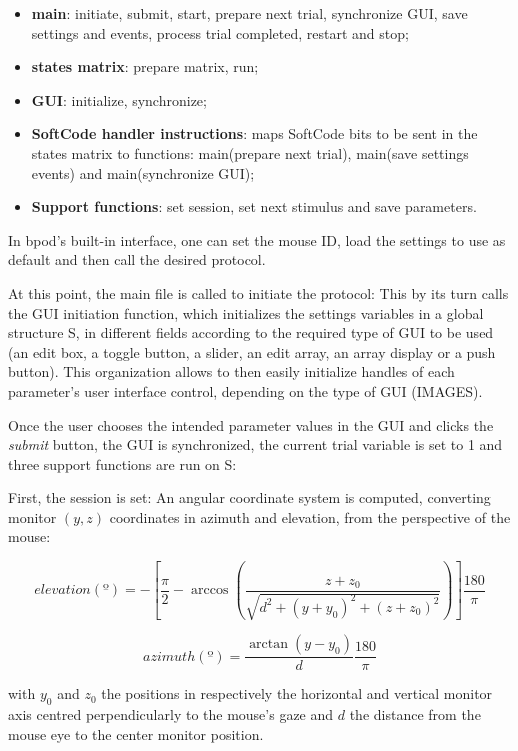 \begin{itemize}
\item \textbf{main}: initiate, submit, start, prepare next trial, synchronize GUI, save settings and events, process trial completed, restart and stop;
\item \textbf{states matrix}: prepare matrix, run;
\item \textbf{GUI}: initialize, synchronize;
\item \textbf{SoftCode handler instructions}: maps SoftCode bits to be sent in the states matrix to functions: main(prepare next trial), main(save settings events) and main(synchronize GUI);
\item \textbf{Support functions}: set session, set next stimulus and save parameters.
\end{itemize}

In bpod's built-in interface, one can set the mouse ID, load the settings to use as default and then call the desired protocol. 

At this point, the main file is called to initiate the protocol: This by its turn calls the GUI initiation function, which initializes the settings variables in a global structure S, in different fields according to the required type of GUI to be used (an edit box, a toggle button, a slider, an edit array, an array display or a push button). This organization allows to then easily initialize handles of each parameter's user interface control, depending on the type of GUI (IMAGES).

Once the user chooses the intended parameter values in the GUI and clicks the \textit{submit} button, the GUI is synchronized, the current trial variable is set to 1 and three support functions are run on S: 

First, the session is set: An angular coordinate system is computed, converting monitor $(y,z)$ coordinates in azimuth and elevation, from the perspective of the mouse:

\begin{equation}
elevation(º)= - \left[ \dfrac{\pi}{2} - \arccos \left( \dfrac{z+z_0}{\sqrt{d^2 + (y + y_0)^2 + (z+z_0)^2}} \right) \right] \dfrac{180}{\pi}
\end{equation}

\begin{equation}
azimuth(º)= \dfrac{\arctan(y-y_0)}{d}\dfrac{180}{\pi}
\end{equation}

with $y_0$ and $z_0$ the positions in respectively the horizontal and vertical monitor axis centred perpendicularly to the mouse's gaze and $d$ the distance from the mouse eye to the center monitor position.

